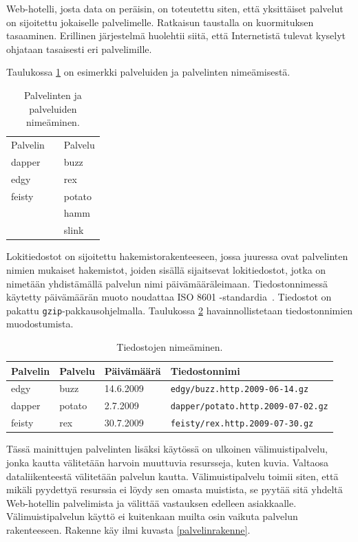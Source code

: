 Web-hotelli, josta data on peräisin, on toteutettu siten, että yksittäiset palvelut on
sijoitettu jokaiselle palvelimelle. Ratkaisun taustalla on
kuormituksen tasaaminen. Erillinen järjestelmä huolehtii siitä, että
Internetistä tulevat kyselyt ohjataan tasaisesti eri
palvelimille. 

Taulukossa \ref{nimet} on esimerkki palveluiden ja
palvelinten nimeämisestä.

\begin{table}[h]
\centering
\begin{tabular}{lll}
Palvelin && Palvelu \\
\cline{1-1}\cline{3-3}
dapper && buzz \\
edgy && rex \\
feisty && potato \\
&& hamm \\
&& slink \\
\end{tabular}
\caption{Palvelinten ja palveluiden nimeäminen.}
\label{nimet}
\end{table}

Lokitiedostot on sijoitettu hakemistorakenteeseen, jossa juuressa ovat
palvelinten nimien mukaiset hakemistot, joiden sisällä sijaitsevat
lokitiedostot, jotka on nimetään yhdistämällä palvelun nimi
päivämääräleimaan. Tiedostonnimessä käytetty päivämäärän muoto
noudattaa ISO 8601 -standardia~\cite{iso8601}. Tiedostot on pakattu
\texttt{gzip}-pakkausohjelmalla. Taulukossa \ref{tiedostot}
havainnollistetaan tiedostonnimien muodostumista.

\begin{table}[h]
\centering
\begin{tabular}{llll}
Palvelin & Palvelu & Päivämäärä & Tiedostonnimi \\
\hline
edgy & buzz & 14.6.2009 & \texttt{edgy/buzz.http.2009-06-14.gz}\\ 
dapper & potato & 2.7.2009 & \texttt{dapper/potato.http.2009-07-02.gz}\\
feisty & rex & 30.7.2009 & \texttt{feisty/rex.http.2009-07-30.gz}\\
\end{tabular}
\caption{Tiedostojen nimeäminen.}
\label{tiedostot}
\end{table}

Tässä mainittujen palvelinten lisäksi käytössä on ulkoinen
välimuistipalvelu, jonka kautta välitetään harvoin muuttuvia
resursseja, kuten kuvia. Valtaosa dataliikenteestä
välitetään palvelun kautta. Välimuistipalvelu toimii siten, että
mikäli pyydettyä resurssia ei löydy sen omasta muistista, se pyytää
sitä yhdeltä Web-hotellin palvelimista ja välittää vastauksen edelleen
asiakkaalle. Välimuistipalvelun käyttö ei kuitenkaan muilta osin
vaikuta palvelun rakenteeseen. Rakenne käy ilmi kuvasta
\ref{palvelinrakenne}.

